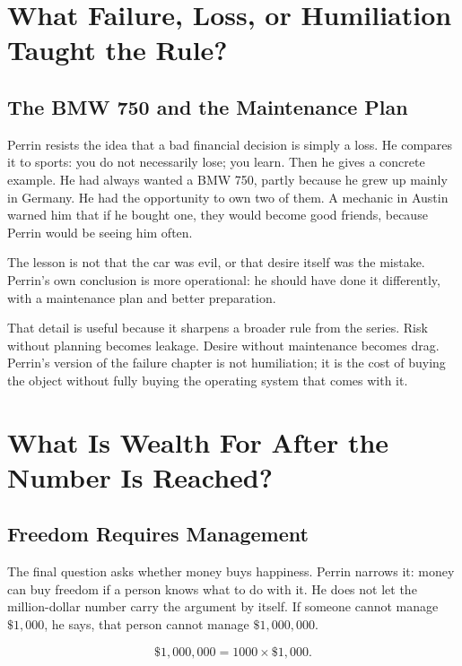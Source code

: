 \documentclass[11pt,oneside]{book}
\begin{document}
\chapter{What Failure, Loss, or Humiliation Taught the Rule?}

\section{The BMW 750 and the Maintenance Plan}

Perrin resists the idea that a bad financial decision is simply a loss. He compares it to sports: you do not necessarily lose; you learn. Then he gives a concrete example. He had always wanted a BMW 750, partly because he grew up mainly in Germany. He had the opportunity to own two of them. A mechanic in Austin warned him that if he bought one, they would become good friends, because Perrin would be seeing him often.

The lesson is not that the car was evil, or that desire itself was the mistake. Perrin's own conclusion is more operational: he should have done it differently, with a maintenance plan and better preparation.

That detail is useful because it sharpens a broader rule from the series. Risk without planning becomes leakage. Desire without maintenance becomes drag. Perrin's version of the failure chapter is not humiliation; it is the cost of buying the object without fully buying the operating system that comes with it.

\chapter{What Is Wealth For After the Number Is Reached?}

\section{Freedom Requires Management}

The final question asks whether money buys happiness. Perrin narrows it: money can buy freedom if a person knows what to do with it. He does not let the million-dollar number carry the argument by itself. If someone cannot manage \(\$1{,}000\), he says, that person cannot manage \(\$1{,}000{,}000\).

\begin{equation}
\$1{,}000{,}000=1000\times\$1{,}000.
\end{equation}
\end{document}
